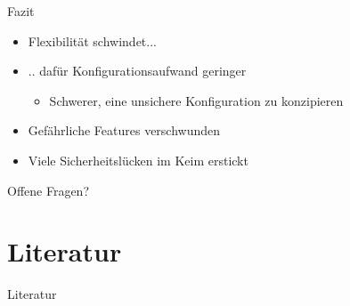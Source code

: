 \documentclass{f4_beamer_metropolis}
\begin{document}
\begin{frame}{Fazit}
\begin{itemize}
  \item Flexibilität schwindet...
  \item .. dafür Konfigurationsaufwand geringer
  \begin{itemize}
    \item Schwerer, eine unsichere Konfiguration zu konzipieren
  \end{itemize}
  \item Gefährliche Features verschwunden
  \item Viele Sicherheitslücken im Keim erstickt
\end{itemize}
\end{frame}

\begin{frame}[standout]
  Offene Fragen?
\end{frame}

\section{Literatur}

\begin{frame}[allowframebreaks]{Literatur}
  \printbibliography
\end{frame}
\end{document}
